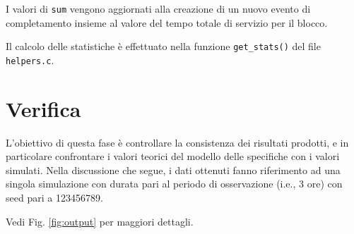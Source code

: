 \documentclass{article}
\begin{document}
I valori di \texttt{sum} vengono aggiornati alla creazione di un nuovo evento di completamento insieme al valore del tempo totale di servizio per il blocco.

Il calcolo delle statistiche è effettuato nella funzione \texttt{get\_stats()} del file \texttt{helpers.c}. 

\section{Verifica}

L'obiettivo di questa fase è controllare la consistenza dei risultati prodotti, e in particolare confrontare i valori teorici del modello delle specifiche con i valori simulati.
Nella discussione che segue, i dati ottenuti fanno riferimento ad una singola simulazione con durata pari al periodo di osservazione (i.e.,  3 ore) con seed pari a 123456789. 

Vedi Fig. \ref{fig:output} per maggiori dettagli.
\end{document}
